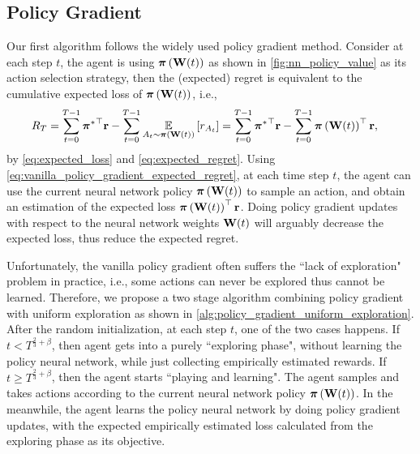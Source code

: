 
\subsection{Policy Gradient}
\label{subsec:policy_gradient}

Our first algorithm follows the widely used policy gradient method. 
Consider at each step $t$, the agent is using ${\boldsymbol{\pi}}\left({\mathbf{W}}(t)\right)$ as shown in \cref{fig:nn_policy_value} as its action selection strategy, then the (expected) regret is equivalent to the cumulative expected loss of ${\boldsymbol{\pi}}\left({\mathbf{W}}(t)\right)$, i.e., 
\begin{equation}
\label{eq:vanilla_policy_gradient_expected_regret}
\begin{split}
    R_T &= \sum\limits_{t=0}^{T-1}{{{\boldsymbol{\pi}}^*}^\top {\mathbf{r}}} - \sum\limits_{t=0}^{T-1}{ \operatorname*{{\mathbb{E}}}\limits_{A_t \sim {\boldsymbol{\pi}}\left({\mathbf{W}}(t)\right)} \left[ r_{A_t} \right] } = \sum\limits_{t=0}^{T-1}{{{\boldsymbol{\pi}}^*}^\top {\mathbf{r}}} - \sum\limits_{t=0}^{T-1}{{\boldsymbol{\pi}}\left({\mathbf{W}}(t)\right)^\top {\mathbf{r}}},
\end{split}
\end{equation}
by \cref{eq:expected_loss} and \cref{eq:expected_regret}. Using \cref{eq:vanilla_policy_gradient_expected_regret}, at each time step $t$, the agent can use the current neural network policy ${\boldsymbol{\pi}}\left({\mathbf{W}}(t)\right)$ to sample an action, and obtain an estimation of the expected loss ${\boldsymbol{\pi}}\left({\mathbf{W}}(t)\right)^\top {\mathbf{r}}$. Doing policy gradient updates with respect to the neural network weights ${\mathbf{W}}(t)$ will arguably decrease the expected loss, thus reduce the expected regret. 

Unfortunately, the vanilla policy gradient often suffers the ``lack of exploration" problem in practice, i.e., some actions can never be explored thus cannot be learned. Therefore, we propose a two stage algorithm combining policy gradient with uniform exploration as shown in \cref{alg:policy_gradient_uniform_exploration}. After the random initialization, at each step $t$, one of the two cases happens. If $t < T^{\frac{2}{3} + \beta}$, then agent gets into a purely ``exploring phase", without learning the policy neural network, while just collecting empirically estimated rewards. If $t \ge T^{\frac{2}{3} + \beta}$, then the agent starts ``playing and learning". The agent samples and takes actions according to the current neural network policy ${\boldsymbol{\pi}}\left({\mathbf{W}}(t)\right)$. In the meanwhile, the agent learns the policy neural network by doing policy gradient updates, with the expected empirically estimated loss calculated from the exploring phase as its objective.

